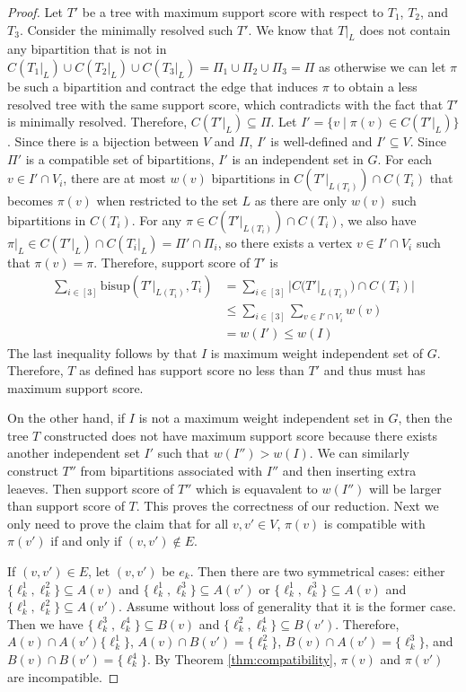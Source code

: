 \documentclass{bmcart}
\newcommand{\bs}{\mathrm{bisup}}
\begin{document}
\begin{proof}
  Let $T'$ be a tree with maximum support score with respect to $T_1$, $T_2$, and $T_3$. Consider the minimally resolved such $T'$. We know that $T|_L$ does not contain any bipartition that is not in $C(T_1|_L) \cup C(T_2|_L) \cup C(T_3|_L) = \Pi_1 \cup \Pi_2 \cup \Pi_3 = \Pi$ as otherwise we can let $\pi$ be such a bipartition and contract the edge that induces $\pi$ to obtain a less resolved tree with the same support score, which contradicts with the fact that $T'$ is minimally resolved. Therefore, $C(T'|_L) \subseteq \Pi$. Let $I' = \{v \mid \pi(v) \in C(T'|_L)\}$. Since there is a bijection between $V$ and $\Pi$, $I'$ is well-defined and $I' \subseteq V$. Since $\Pi'$ is a compatible set of bipartitions, $I'$ is an independent set in $G$. For each $v \in I'\cap V_i$, there are at most $w(v)$ bipartitions in $C(T'|_{L(T_i)}) \cap C(T_i)$ that becomes $\pi(v)$ when restricted to the set $L$ as there are only $w(v)$ such bipartitions in $C(T_i)$. For any $\pi \in C(T'|_{L(T_i)}) \cap C(T_i)$, we also have $\pi|_L \in C(T'|_L) \cap C(T_i|_L) = \Pi' \cap \Pi_i$, so there exists a vertex $v \in I' \cap V_i$ such that $\pi(v) = \pi$. Therefore, support score of $T'$ is 
  \begin{align*}
    \sum_{i \in [3]} \bs(T'|_{L(T_i)}, T_i) &= \sum_{i \in [3]} |C(T'|_{L(T_i)}) \cap C(T_i)|\\
    &\le \sum_{i \in [3]} \sum_{v \in I' \cap V_i} w(v) \\
    &= w(I') \le w(I) 
  \end{align*}
  The last inequality follows by that $I$ is maximum weight independent set of $G$. Therefore, $T$ as defined has support score no less than $T'$ and thus must has maximum support score. \smallskip

  On the other hand, if $I$ is not a maximum weight independent set in $G$, then the tree $T$ constructed does not have maximum support score because there exists another independent set $I'$ such that $w(I'') > w(I)$. We can similarly construct $T''$ from bipartitions associated with $I''$ and then inserting extra leaeves. Then support score of $T''$ which is equavalent to $w(I'')$ will be larger than support score of $T$. This proves the correctness of our reduction. Next we only need to prove the claim that for all $v,v' \in V$, $\pi(v)$ is compatible with $\pi(v')$ if and only if $(v,v') \notin E$. \smallskip

  If $(v,v') \in E$, let $(v,v')$ be $e_k$. Then there are two symmetrical cases: either $\{\ell_k^1,\ell_k^2\} \subseteq A(v)$ and $\{\ell_k^1,\ell_k^3\} \subseteq A(v')$ or $\{\ell_k^1,\ell_k^3\} \subseteq A(v)$ and $\{\ell_k^1,\ell_k^2\} \subseteq A(v')$. Assume without loss of generality that it is the former case. Then we have  $\{\ell_k^3,\ell_k^4\} \subseteq B(v)$ and $\{\ell_k^2,\ell_k^4\} \subseteq B(v')$. Therefore, $A(v) \cap A(v') \{\ell_k^1\}$, $A(v) \cap B(v') = \{\ell_k^2\}$, $B(v) \cap A(v')= \{\ell_k^3\}$, and $B(v) \cap B(v') = \{\ell_k^4\}$. By Theorem \ref{thm:compatibility}, $\pi(v)$ and $\pi(v')$ are incompatible.\smallskip


\end{proof}
\end{document}
